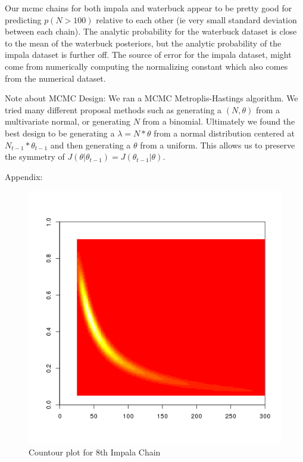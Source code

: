 \documentclass[paper=a4, fontsize=11pt]{scrartcl}
\begin{document}
\begin{enumerate}
\begin{enumerate}[1]
    \end{enumerate}
    Our mcmc chains for both impala and waterbuck appear to be pretty good for predicting $p(N > 100)$ relative to each other (ie very small standard deviation between each chain). The analytic probability for the waterbuck dataset is close to the mean of the waterbuck posteriors, but the analytic probability of the impala dataset is further off. The source of error for the impala dataset, might come from numerically computing the normalizing constant which also comes from the numerical dataset.

    Note about MCMC Design: We ran a MCMC Metroplis-Hastings algorithm. We tried many different proposal methods such as generating a $(N, \theta)$ from a multivariate normal, or generating $N$ from a binomial. Ultimately we found the best design to be generating a $\lambda = N*\theta$ from a normal distribution centered at $N_{t-1}*\theta_{t-1}$ and then generating a $\theta$ from a uniform. This allows us to preserve the symmetry of $J(\theta | \theta_{t-1}) = J( \theta_{t-1} | \theta)$.
\end{enumerate}

\clearpage
Appendix: \\
\begin{figure}[h!]
  \caption{Countour plot for 8th Impala Chain}
  \centering
	\includegraphics[scale=.8]{keskici_wxiao_ps4_task_impala_run5_plot8.png}
\end{figure}
\end{document}
